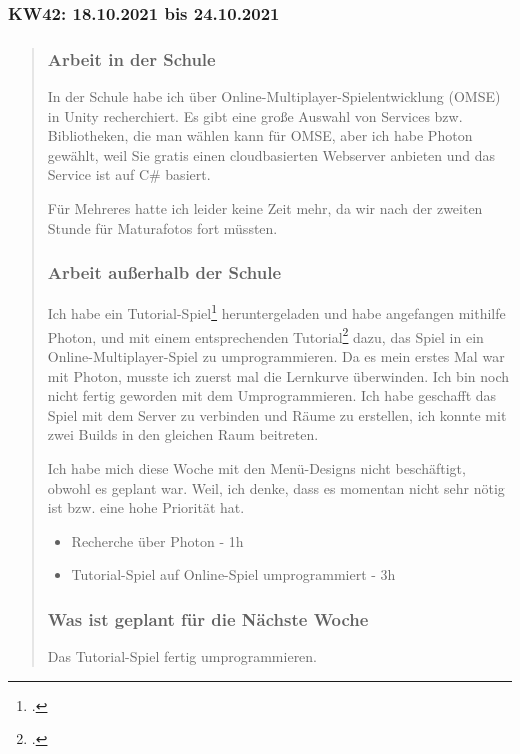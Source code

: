 \subsubsection{KW42: 18.10.2021 bis 24.10.2021}
\begin{quote}
	\subsubsection*{Arbeit in der Schule}
	In der Schule habe ich über Online-Multiplayer-Spielentwicklung (OMSE) in Unity recherchiert. Es gibt eine große Auswahl von Services bzw. Bibliotheken, die man wählen kann für OMSE, aber ich habe Photon gewählt, weil Sie gratis einen cloudbasierten Webserver anbieten und das Service ist auf C\# basiert.
	
	Für Mehreres hatte ich leider keine Zeit mehr, da wir nach der zweiten Stunde für Maturafotos fort müssten.  
	
	\subsubsection*{Arbeit außerhalb der Schule}
	Ich habe ein Tutorial-Spiel\footcite{Karting Microgame Unity3D} heruntergeladen und habe angefangen mithilfe Photon, und mit einem entsprechenden Tutorial\footcite{Unity Photon Tutorial} dazu, das Spiel in ein Online-Multiplayer-Spiel zu umprogrammieren. Da es mein erstes Mal war mit Photon, musste ich zuerst mal die Lernkurve überwinden. Ich bin noch nicht fertig geworden mit dem Umprogrammieren. Ich habe geschafft das Spiel mit dem Server zu verbinden und Räume zu erstellen, ich konnte mit zwei Builds in den gleichen Raum beitreten.
	
	Ich habe mich diese Woche mit den Menü-Designs nicht beschäftigt, obwohl es geplant war. Weil, ich denke, dass es momentan nicht sehr nötig ist bzw. eine hohe Priorität hat.   
	
	\begin{itemize}
		\item Recherche über Photon - 1h
		\item Tutorial-Spiel auf Online-Spiel umprogrammiert - 3h
	\end{itemize}
	
	\subsubsection*{Was ist geplant für die Nächste Woche}
	Das Tutorial-Spiel fertig umprogrammieren.
\end{quote}